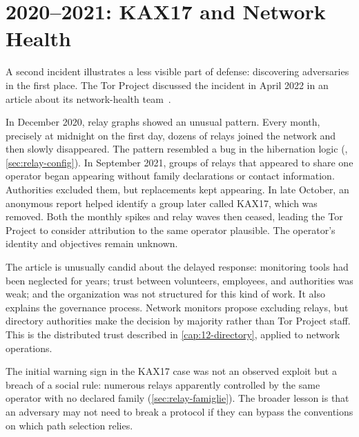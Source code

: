 \section{2020--2021: KAX17 and Network Health}\label{sec:casi-kax17}

A second incident illustrates a less visible part of defense: discovering adversaries in the first place. The Tor Project discussed the incident in April 2022 in an article about its network-health team~\cite{torblog2022badrelays}.

In December 2020, relay graphs showed an unusual pattern. Every month, precisely at midnight on the first day, dozens of relays joined the network and then slowly disappeared. The pattern resembled a bug in the hibernation logic (, \cref{sec:relay-config}). In September 2021, groups of relays that appeared to share one operator began appearing without family declarations or contact information. Authorities excluded them, but replacements kept appearing. In late October, an anonymous report helped identify a group later called KAX17, which was removed. Both the monthly spikes and relay waves then ceased, leading the Tor Project to consider attribution to the same operator plausible. The operator's identity and objectives remain unknown.

The article is unusually candid about the delayed response: monitoring tools had been neglected for years; trust between volunteers, employees, and authorities was weak; and the organization was not structured for this kind of work. It also explains the governance process. Network monitors propose excluding relays, but directory authorities make the decision by majority rather than Tor Project staff. This is the distributed trust described in \cref{cap:12-directory}, applied to network operations.

\begin{approfondimento}
The initial warning sign in the KAX17 case was not an observed exploit but a breach of a social rule: numerous relays apparently controlled by the same operator with no declared family (\cref{sec:relay-famiglie}). The broader lesson is that an adversary may not need to break a protocol if they can bypass the conventions on which path selection relies.
\end{approfondimento}

